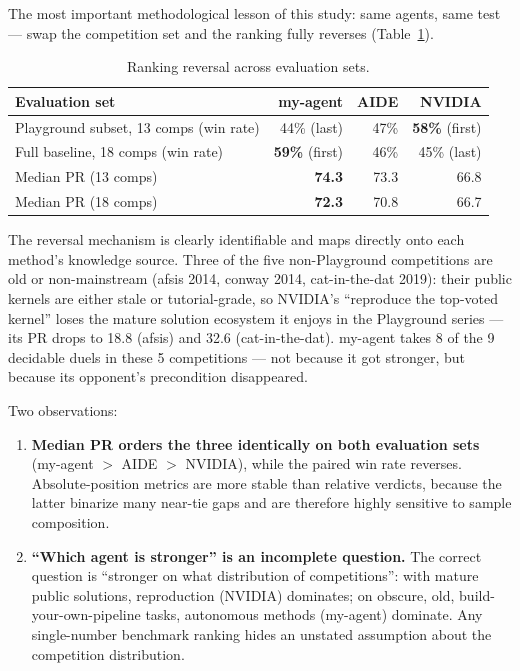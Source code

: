 \documentclass[11pt,a4paper]{article}
\begin{document}
The most important methodological lesson of this study: same agents, same test --- swap the competition set and the ranking fully reverses (Table~\ref{tab:reversal}).

\begin{table}[htbp]
\centering\small
\caption{Ranking reversal across evaluation sets.}
\label{tab:reversal}
\begin{tabular}{@{}lrrr@{}}
\toprule
\textbf{Evaluation set} & \textbf{my-agent} & \textbf{AIDE} & \textbf{NVIDIA} \\
\midrule
Playground subset, 13 comps (win rate) & 44\% (last) & 47\% & \textbf{58\%} (first) \\
Full baseline, 18 comps (win rate) & \textbf{59\%} (first) & 46\% & 45\% (last) \\
Median PR (13 comps) & \textbf{74.3} & 73.3 & 66.8 \\
Median PR (18 comps) & \textbf{72.3} & 70.8 & 66.7 \\
\bottomrule
\end{tabular}
\end{table}

The reversal mechanism is clearly identifiable and maps directly onto each method's knowledge source. Three of the five non-Playground competitions are old or non-mainstream (afsis 2014, conway 2014, cat-in-the-dat 2019): their public kernels are either stale or tutorial-grade, so NVIDIA's ``reproduce the top-voted kernel'' loses the mature solution ecosystem it enjoys in the Playground series --- its PR drops to 18.8 (afsis) and 32.6 (cat-in-the-dat). my-agent takes 8 of the 9 decidable duels in these 5 competitions --- not because it got stronger, but because its opponent's precondition disappeared.

Two observations:

\begin{enumerate}[leftmargin=*]
  \item \textbf{Median PR orders the three identically on both evaluation sets} (my-agent $>$ AIDE $>$ NVIDIA), while the paired win rate reverses. Absolute-position metrics are more stable than relative verdicts, because the latter binarize many near-tie gaps and are therefore highly sensitive to sample composition.
  \item \textbf{``Which agent is stronger'' is an incomplete question.} The correct question is ``stronger on what distribution of competitions'': with mature public solutions, reproduction (NVIDIA) dominates; on obscure, old, build-your-own-pipeline tasks, autonomous methods (my-agent) dominate. Any single-number benchmark ranking hides an unstated assumption about the competition distribution.
\end{enumerate}
\end{document}
